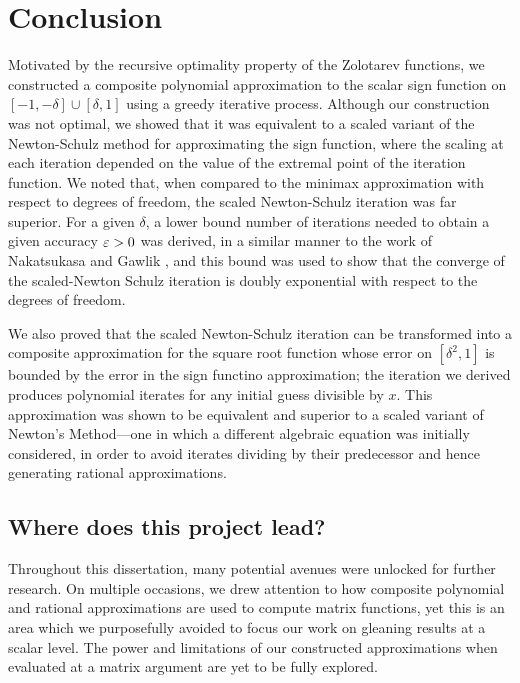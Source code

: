 \chapter{Conclusion}

Motivated by the recursive optimality property of the Zolotarev functions, we constructed a composite polynomial approximation to the scalar sign function on $[-1,-\delta]\cup[\delta,1]$ using a greedy iterative process. Although our construction was not optimal, we showed that it was equivalent to a scaled variant of the Newton-Schulz method for approximating the sign function, where the scaling at each iteration depended on the value of the extremal point of the iteration function. We noted that, when compared to the minimax approximation with respect to degrees of freedom, the scaled Newton-Schulz iteration was far superior. For a given $\delta$, a lower bound number of iterations needed to obtain a given accuracy $\varepsilon>0$ was derived, in a similar manner to the work of Nakatsukasa and Gawlik \cite{Yuji}, and this bound was used to show that the converge of the scaled-Newton Schulz iteration is doubly exponential with respect to the degrees of freedom.

\bigskip{}

We also proved that the scaled Newton-Schulz iteration can be transformed into a composite approximation for the square root function whose error on $[\delta^2,1]$ is bounded by the error in the sign functino approximation; the iteration we derived produces polynomial iterates for any initial guess divisible by $x$. This approximation was shown to be equivalent and superior to a scaled variant of Newton's Method---one in which a different algebraic equation was initially considered, in order to avoid iterates dividing by their predecessor and hence generating rational approximations. 

\bigskip{}



\section{Where does this project lead?}

Throughout this dissertation, many potential avenues were unlocked for further research. On multiple occasions, we drew attention to how composite polynomial and rational approximations are used to compute matrix functions, yet this is an area which we purposefully avoided to focus our work on gleaning results at a scalar level. The power and limitations of our constructed approximations when evaluated at a matrix argument are yet to be fully explored.

